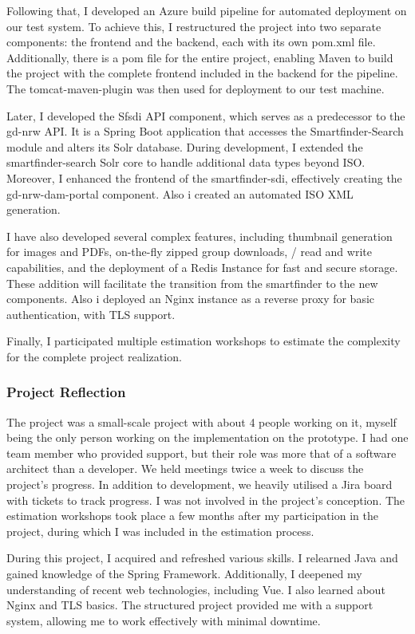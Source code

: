 \documentclass[11pt, titlepage, a4paper]{article}
\begin{document}
Following that, I developed an Azure build pipeline for automated deployment on our test system.  To achieve this, I restructured the project into two separate components: the frontend and the backend, each with its own pom.xml file. Additionally, there is a pom file for the entire project, enabling Maven to build the project with the complete frontend included in the backend for the pipeline. The tomcat-maven-plugin was then used for deployment to our test machine.

Later, I developed the Sfsdi API component, which serves as a predecessor to the gd-nrw API. It is a Spring Boot application that accesses the Smartfinder-Search module and alters its Solr database. During development, I extended the smartfinder-search Solr core to handle additional data types beyond ISO. Moreover, I enhanced the frontend of the smartfinder-sdi, effectively creating the gd-nrw-dam-portal component.
Also i created an automated ISO XML generation.

I have also developed several complex features, including thumbnail generation for images and PDFs, on-the-fly zipped group downloads, / read and write capabilities, and the deployment of a Redis Instance for fast and secure storage. These addition will facilitate the transition from the smartfinder to the new components. Also i deployed an Nginx instance as a reverse proxy for basic authentication, with TLS support.

Finally, I participated multiple estimation workshops to estimate the complexity for the complete project realization.

\subsubsection{Project Reflection}
The project was a small-scale project with about 4 people working on it, myself being the only person working on the implementation on the prototype. I had one team member who provided support, but their role was more that of a software architect than a developer. 
We held meetings twice a week to discuss the project's progress. In addition to development, we heavily utilised a Jira board with tickets to track progress. I was not involved in the project's conception.
The estimation workshops took place a few months after my participation in the project, during which I was included in the estimation process.

During this project, I acquired and refreshed various skills. I relearned Java and gained knowledge of the Spring Framework. Additionally, I deepened my understanding of recent web technologies, including Vue. I also learned about Nginx and TLS basics.
The structured project provided me with a support system, allowing me to work effectively with minimal downtime.
\end{document}

